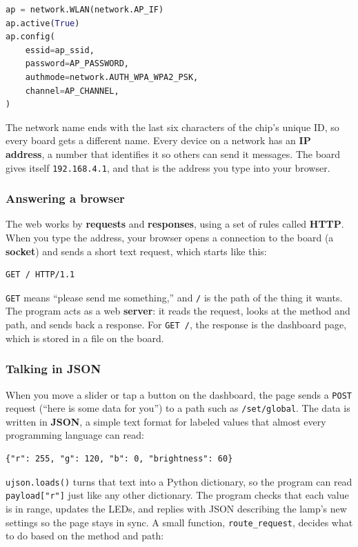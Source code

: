 \begin{lstlisting}[language=Python, caption=Starting the access point]
ap = network.WLAN(network.AP_IF)
ap.active(True)
ap.config(
    essid=ap_ssid,
    password=AP_PASSWORD,
    authmode=network.AUTH_WPA_WPA2_PSK,
    channel=AP_CHANNEL,
)
\end{lstlisting}

The network name ends with the last six characters of the chip's unique ID, so every board gets a
different name. Every device on a network has an \textbf{IP address}, a number that identifies it
so others can send it messages. The board gives itself \texttt{192.168.4.1}, and that is the
address you type into your browser.

\subsubsection{Answering a browser}
The web works by \textbf{requests} and \textbf{responses}, using a set of rules called
\textbf{HTTP}. When you type the address, your browser opens a connection to the board (a
\textbf{socket}) and sends a short text request, which starts like this:

\begin{lstlisting}[caption=The first line of a browser's request]
GET / HTTP/1.1
\end{lstlisting}

\texttt{GET} means ``please send me something,'' and \texttt{/} is the path of the thing it wants.
The program acts as a web \textbf{server}: it reads the request, looks at the method and path, and
sends back a response. For \texttt{GET /}, the response is the dashboard page, which is stored in a
file on the board.

\subsubsection{Talking in JSON}
When you move a slider or tap a button on the dashboard, the page sends a \texttt{POST} request (``here
is some data for you'') to a path such as \texttt{/set/global}. The data is written in
\textbf{JSON}, a simple text format for labeled values that almost every programming language can
read:

\begin{lstlisting}[caption=An example request body from the dashboard]
{"r": 255, "g": 120, "b": 0, "brightness": 60}
\end{lstlisting}

\texttt{ujson.loads()} turns that text into a Python dictionary, so the program can read
\texttt{payload["r"]} just like any other dictionary. The program checks that each value is in range,
updates the LEDs, and replies with JSON describing the lamp's new settings so the page stays in
sync. A small function, \texttt{route\_request}, decides what to do based on the method and path:

